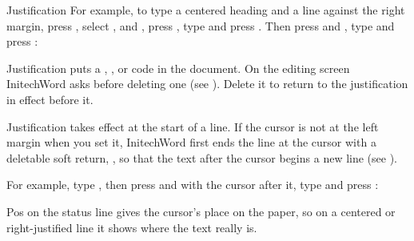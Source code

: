 \begin{Feature}{Justification}
For example, to type a centered heading and a line against the right
margin, press , select ,
 and , press ,
type  and press .  Then press
 and , type  and press
:
\EndReplay

\Notes
{}
Justification puts a , ,
 or  code in the document.  On the
editing screen InitechWord asks before deleting one (see ).
Delete it to return to the justification in effect before it.

Justification takes effect at the start of a line.  If the cursor is not at
the left margin when you set it, InitechWord first ends the line at the
cursor with a deletable soft return, \Code{[DSRt]}, so that the text after
the cursor begins a new line (see ).

For example, type , then press 
and  with the cursor after it, type  and press
:
\EndReplay

Pos on the status line gives the cursor's place on the paper, so on a
centered or right-justified line it shows where the text really is.

\end{Feature}

